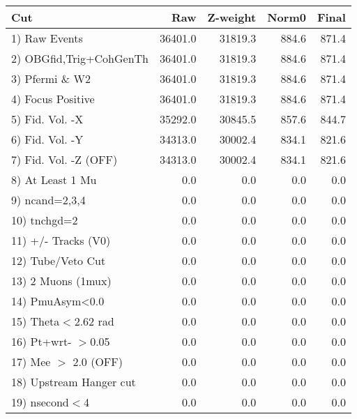  \begin{table}[h!]\centering
 \begin{tabular}{||l||r|r|r|r||}
 \hline
 \hline
 Cut & Raw & Z-weight & Norm0 & Final \\
 \hline
  1) Raw Events           &     36401.0 &     31819.3 &       884.6 &       871.4 \\
  2) OBGfid,Trig+CohGenTh &     36401.0 &     31819.3 &       884.6 &       871.4 \\
  3) Pfermi \& W2         &     36401.0 &     31819.3 &       884.6 &       871.4 \\
  4) Focus Positive       &     36401.0 &     31819.3 &       884.6 &       871.4 \\
  5) Fid. Vol. -X         &     35292.0 &     30845.5 &       857.6 &       844.7 \\
  6) Fid. Vol. -Y         &     34313.0 &     30002.4 &       834.1 &       821.6 \\
  7) Fid. Vol. -Z (OFF)   &     34313.0 &     30002.4 &       834.1 &       821.6 \\
  8) At Least 1 Mu        &         0.0 &         0.0 &         0.0 &         0.0 \\
  9) ncand=2,3,4          &         0.0 &         0.0 &         0.0 &         0.0 \\
 10) tnchgd=2             &         0.0 &         0.0 &         0.0 &         0.0 \\
 11) +/- Tracks (V0)      &         0.0 &         0.0 &         0.0 &         0.0 \\
 12) Tube/Veto Cut        &         0.0 &         0.0 &         0.0 &         0.0 \\
 13) 2 Muons (1mux)       &         0.0 &         0.0 &         0.0 &         0.0 \\
 14) PmuAsym<0.0          &         0.0 &         0.0 &         0.0 &         0.0 \\
 15) Theta$<$2.62 rad     &         0.0 &         0.0 &         0.0 &         0.0 \\
 16) Pt+wrt- $>$0.05      &         0.0 &         0.0 &         0.0 &         0.0 \\
 17) Mee $>$ 2.0  (OFF)   &         0.0 &         0.0 &         0.0 &         0.0 \\
 18) Upstream Hanger cut  &         0.0 &         0.0 &         0.0 &         0.0 \\
 19) nsecond$<$4          &         0.0 &         0.0 &         0.0 &         0.0 \\

\end{tabular}
\end{table}
